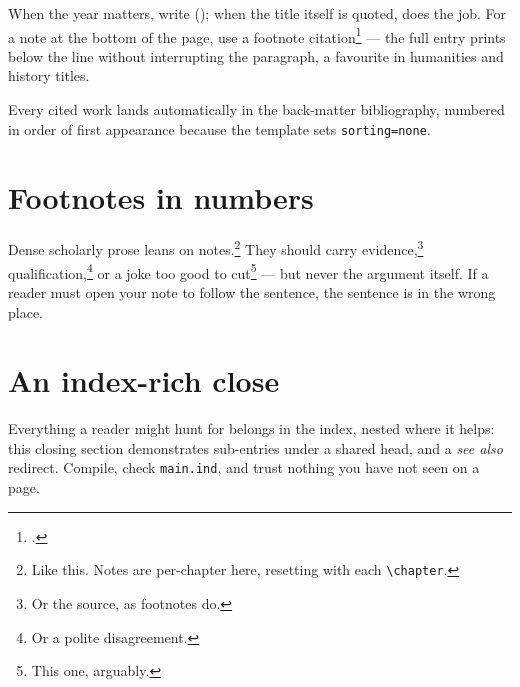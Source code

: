 When the year matters, write \textcite{texgyre}
(\citeyear{texgyre}); when the title itself is quoted,
\emph{} does the job. For a note at the bottom
of the page, use a footnote citation\footcite{bringhurst2004} ---
the full entry prints below the line without interrupting the
paragraph, a favourite in humanities and history
titles.

Every cited work lands automatically in the back-matter
bibliography, numbered in order of first appearance because the
template sets \texttt{sorting=none}.

\section{Footnotes in numbers}
Dense scholarly prose leans on notes.\footnote{Like this. Notes are
per-chapter here, resetting with each \texttt{\textbackslash chapter}.} They
should carry evidence,\footnote{Or the source, as footnotes do.}
qualification,\footnote{Or a polite disagreement.} or a joke too
good to cut\footnote{This one, arguably.} --- but never the argument
itself. If a reader must open your note to follow the sentence, the
sentence is in the wrong place.

\section{An index-rich close}
Everything a reader might hunt for belongs in the index, nested
where it helps:%
this closing section demonstrates sub-entries under a shared head,
and a \emph{see also} redirect. Compile, check
\texttt{main.ind}, and trust nothing you have not seen on a page.